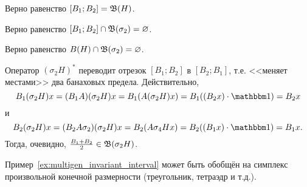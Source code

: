 \begin{hypothesis}
	Верно равенство $[B_1; B_2] = \mathfrak{B}(H)$.
\end{hypothesis}

\begin{hypothesis}
	Верно равенство $[B_1; B_2] \cap \mathfrak{B}(\sigma_2) = \varnothing$.
\end{hypothesis}

\begin{hypothesis}
	Верно равенство $B(H) \cap \mathfrak{B}(\sigma_2) = \varnothing$.
\end{hypothesis}

\begin{remark}
	Оператор $(\sigma_2 H)^*$ переводит отрезок $[B_1; B_2]$ в $[B_2; B_1]$,
	т.е. <<меняет местами>> два банаховых предела.
	Действительно,
	\begin{equation}
		B_1 (\sigma_2 H)x  = (B_1 A) (\sigma_2 H)x = B_1 (A(\sigma_2 H)x)  = B_1 ((B_2 x) \cdot \one) = B_2 x
	\end{equation}
	и
	\begin{equation}
		B_2 (\sigma_2 H)x  = (B_2 A\sigma_2) (\sigma_2 H)x = B_2 (A\sigma_4 Hx)  = B_2 ((B_1 x) \cdot \one) = B_1 x
		.
	\end{equation}
	Тогда, очевидно, $\frac{B_1 + B_2}2 \in \mathfrak{B}(\sigma_2 H)$.
\end{remark}

\begin{hypothesis}
	Пример~\ref{ex:multigen_invariant_interval} может быть обобщён на симплекс произвольной конечной размерности
	(треугольник, тетраэдр и т.д.).
\end{hypothesis}
